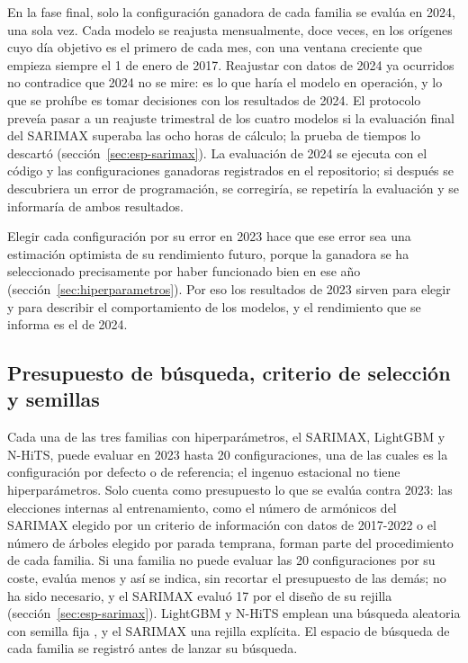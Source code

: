En la fase final, solo la configuración ganadora de cada familia se evalúa
en 2024, una sola vez. Cada modelo se reajusta mensualmente, doce veces, en
los orígenes cuyo día objetivo es el primero de cada mes, con una ventana
creciente que empieza siempre el 1 de enero de 2017. Reajustar con datos de
2024 ya ocurridos no contradice que 2024 no se mire: es lo que haría el
modelo en operación, y lo que se prohíbe es tomar decisiones con los
resultados de 2024. El protocolo preveía pasar a un reajuste trimestral de
los cuatro modelos si la evaluación final del SARIMAX superaba las ocho horas
de cálculo; la prueba de tiempos lo descartó (sección~\ref{sec:esp-sarimax}).
La evaluación de 2024 se ejecuta con el código y las configuraciones
ganadoras registrados en el repositorio; si después se descubriera un error
de programación, se corregiría, se repetiría la evaluación y se informaría de
ambos resultados.

Elegir cada configuración por su error en 2023 hace que ese error sea una
estimación optimista de su rendimiento futuro, porque la ganadora se ha
seleccionado precisamente por haber funcionado bien en ese año
(sección~\ref{sec:hiperparametros}). Por eso los resultados de 2023 sirven
para elegir y para describir el comportamiento de los modelos, y el
rendimiento que se informa es el de 2024.

\subsection{Presupuesto de búsqueda, criterio de selección y semillas}\label{sec:prot-presupuesto}

Cada una de las tres familias con hiperparámetros, el SARIMAX, LightGBM y
N-HiTS, puede evaluar en 2023 hasta 20 configuraciones, una de las cuales es
la configuración por defecto o de referencia; el ingenuo estacional no tiene
hiperparámetros. Solo cuenta como presupuesto lo que se evalúa contra 2023:
las elecciones internas al entrenamiento, como el número de armónicos del
SARIMAX elegido por un criterio de información con datos de 2017-2022 o el
número de árboles elegido por parada temprana, forman parte del
procedimiento de cada familia. Si una familia no puede evaluar las 20
configuraciones por su coste, evalúa menos y así se indica, sin recortar el
presupuesto de las demás; no ha sido necesario, y el SARIMAX evaluó 17 por
el diseño de su rejilla (sección~\ref{sec:esp-sarimax}). LightGBM y N-HiTS emplean una búsqueda aleatoria
con semilla fija \parencite{bergstra2012random}, y el SARIMAX una rejilla
explícita. El espacio de búsqueda de cada familia se registró antes de
lanzar su búsqueda.

